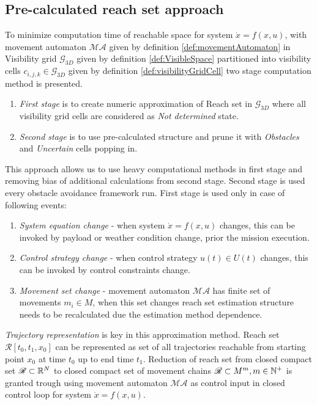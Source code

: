 \subsection{Pre-calculated reach set approach}
\noindent To minimize computation time of reachable space for system $\dot{x}=f(x,u)$, with movement automaton $\mathscr{MA}$ given by definition \ref{def:movementAutomaton} in Visibility grid $\mathscr{G}_{3D}$ given by definition \ref{def:VisibleSpace} partitioned into visibility cells $c_{i,j,k}\in \mathscr{G}_{3D}$ given by definition \ref{def:visibilityGridCell} two stage computation method is presented. 
\begin{enumerate}
    \item \textit{First stage} is to create numeric approximation of Reach set in $\mathscr{G}_{3D}$ where all visibility grid cells are considered as \textit{Not determined} state.
    \item \textit{Second stage} is to use pre-calculated structure and prune it with \textit{Obstacles} and \textit{Uncertain} cells popping in.
\end{enumerate}
 This approach allows us to use heavy computational methods in first stage and removing bias of additional calculations from second stage. Second stage is used every obstacle avoidance framework run. First stage is used only in case of following events:
\begin{enumerate}
    \item \textit{System equation change} - when system $\dot{x}=f(x,u)$ changes, this can be invoked by payload or weather condition change, prior the mission execution.
    \item \textit{Control strategy change} - when control strategy $u(t)\in U(t)$ changes, this can be invoked by control constraints change.
    \item \textit{Movement set change} - movement automaton $\mathscr{MA}$ has finite set of movements $m_i\in M$, when this set changes reach set estimation structure needs to be recalculated due the estimation method dependence. 
\end{enumerate}

\noindent\textit{Trajectory representation} is key in this approximation method. Reach set $\mathscr{R}[t_0,t_1,x_0]$ can be represented as set of all trajectories reachable from starting point $x_0$ at time $t_0$ up to end time $t_1$. Reduction of reach set from closed compact set $\mathscr{R}\subset \mathbb{R}^N$ to closed compact set of movement chains $\mathscr{R}\subset M^m, m\in\mathbb{N}^+$ is granted trough using movement automaton $\mathscr{MA}$ as control input in closed control loop for system $\dot{x} = f(x,u)$.

